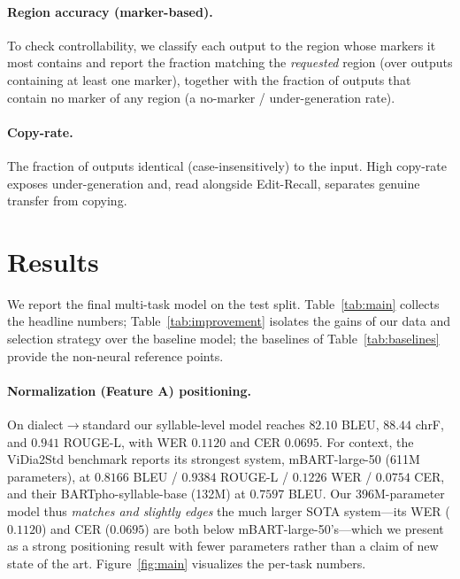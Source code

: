 \documentclass[11pt]{article}
\begin{document}
\paragraph{Region accuracy (marker-based).}
To check controllability, we classify each output to the region whose markers it
most contains and report the fraction matching the \emph{requested} region (over
outputs containing at least one marker), together with the fraction of outputs that
contain no marker of any region (a no-marker / under-generation rate).

\paragraph{Copy-rate.}
The fraction of outputs identical (case-insensitively) to the input. High copy-rate
exposes under-generation and, read alongside Edit-Recall, separates genuine
transfer from copying.

\section{Results}
\label{sec:results}

We report the final multi-task model on the test split. Table~\ref{tab:main}
collects the headline numbers; Table~\ref{tab:improvement} isolates the gains of
our data and selection strategy over the baseline model; the baselines of
Table~\ref{tab:baselines} provide the non-neural reference points.

\paragraph{Normalization (Feature A) positioning.}
On dialect$\rightarrow$standard our syllable-level model reaches $82.10$ BLEU,
$88.44$ chrF, and $0.941$ ROUGE-L, with WER $0.1120$ and CER $0.0695$. For
context, the ViDia2Std benchmark \citep{ta2026vidia2std} reports its strongest
system, mBART-large-50 (611M parameters), at $0.8166$ BLEU / $0.9384$ ROUGE-L /
$0.1226$ WER / $0.0754$ CER, and their BARTpho-syllable-base (132M) at $0.7597$
BLEU. Our 396M-parameter model thus \emph{matches and slightly edges} the much
larger SOTA system---its WER ($0.1120$) and CER ($0.0695$) are both below
mBART-large-50's---which we present as a strong positioning result with fewer
parameters rather than a claim of new state of the art. Figure~\ref{fig:main}
visualizes the per-task numbers.
\end{document}
